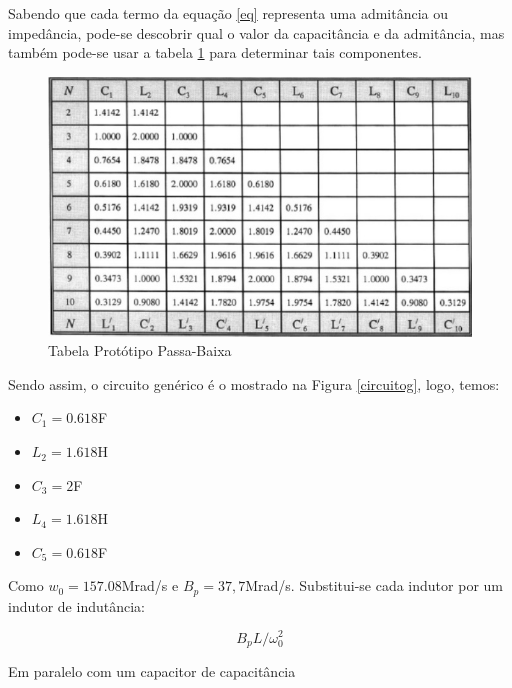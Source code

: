 \documentclass[14pt, oneside]{book}
\theoremstyle{definition}
\begin{document}
            Sabendo que cada termo da equação \ref{eq} representa uma admitância ou impedância, pode-se descobrir qual o valor da capacitância e da admitância, mas também pode-se usar a tabela \ref{tabelassa} para determinar tais componentes.
            
            \begin{figure}[H]
                \centering
                \includegraphics[scale=0.5]{tabelassa.jpeg}
                \caption{Tabela Protótipo Passa-Baixa}
                \label{tabelassa}
            \end{figure}
            
            Sendo assim, o circuito genérico é o mostrado na Figura \ref{circuitog}, logo, temos:
            
            \begin{itemize}
                \item $C_1= 0.618$F
                \item $L_2 = 1.618$H
                \item $C_3= 2$F
                \item $L_4 = 1.618$H
                \item $C_5 = 0.618$F
            \end{itemize}
            
            Como $w_0 = 157.08$Mrad/s e $B_p = 37,7$Mrad/s. Substitui-se cada indutor por um indutor de indutância:
            
            \begin{equation}
            B_pL/\omega_0^2
            \end{equation}
            
            Em paralelo com um capacitor de capacitância
            
\end{document}
